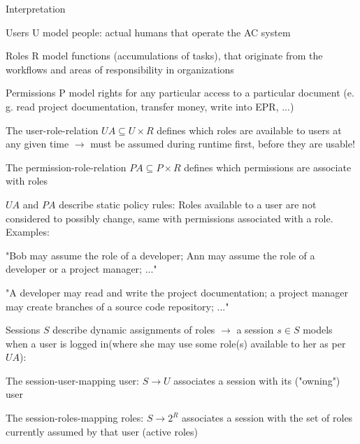 \documentclass[a4paper]{article}
\begin{document}
\begin{multicols}{3}
    Interpretation
    \begin{itemize*}
        \item Users U model people: actual humans that operate the AC system
        \item Roles R model functions (accumulations of tasks), that originate from the workflows and areas of responsibility in organizations
        \item Permissions P model rights for any particular access to a particular document (e. g. read project documentation, transfer money, write into EPR, ...)
        \item The user-role-relation $UA\subseteq U\times R$ defines which roles are available to users at any given time $\rightarrow$ must be assumed during runtime first, before they are usable!
        \item The permission-role-relation $PA\subseteq P\times R$ defines which permissions are associate with roles
        \item $UA$ and $PA$ describe static policy rules: Roles available to a user are not considered to possibly change, same with permissions associated with a role. Examples:
              \begin{itemize*}
                  \item "Bob may assume the role of a developer; Ann may assume the role of a developer or a project manager; ..."
                  \item "A developer may read and write the project documentation; a project manager may create branches of a source code repository; ..."
              \end{itemize*}
        \item Sessions $S$ describe dynamic assignments of roles $\rightarrow$ a session $s\in S$ models when a user is logged in(where she may use some role(s) available to her as per $UA$):
              \begin{itemize*}
                  \item The session-user-mapping user: $S\rightarrow U$ associates a session with its ("owning") user
                  \item The session-roles-mapping roles: $S\rightarrow 2^R$ associates a session with the set of roles currently assumed by that user (active roles)
              \end{itemize*}
    \end{itemize*}



\end{multicols}
\end{document}
